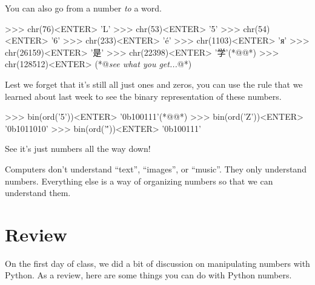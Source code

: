 You can also go from a number \emph{to} a word.

\begin{replbox}
>>> chr(76)<ENTER>
'L'
>>> chr(53)<ENTER>
'5'
>>> chr(54)<ENTER>
'6'
>>> chr(233)<ENTER>
'é'
>>> chr(1103)<ENTER>
'я'
>>> chr(26159)<ENTER>
'是'
>>> chr(22398)<ENTER>
'学'(*@@*)
>>> chr(128512)<ENTER>
(*@\emph{see what you get...}@*)
\end{replbox}

Lest we forget that it's still all just ones and zeros, you can use the  rule that we
learned about last week to see the binary representation of these numbers.

\begin{replbox}
>>> bin(ord('5'))<ENTER>
'0b100111'(*@@*)
>>> bin(ord('Z'))<ENTER>
'0b1011010'
>>> bin(ord('\''))<ENTER>
'0b100111'
\end{replbox}

See it's just numbers all the way down!

\begin{BigIdeaBox}
  Computers don't understand ``text'', ``images'', or ``music''.
  They only understand numbers.
  Everything else is a way of organizing numbers so that we can understand them.
\end{BigIdeaBox}

\section{Review}

On the first day of class, we did a bit of discussion on manipulating numbers with Python. As a
review, here are some things you can do with Python numbers.

